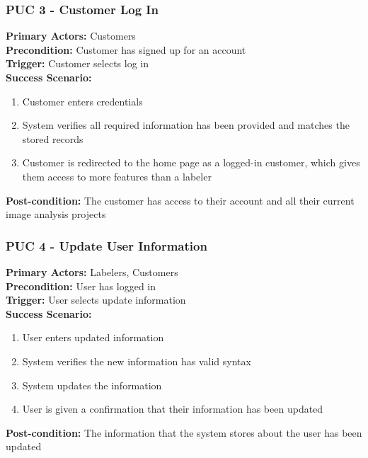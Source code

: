 \documentclass[12pt]{article}
\begin{document}
\subsubsection{PUC 3 - Customer Log In}
\textbf{Primary Actors:} Customers\\ 
\textbf{Precondition:} Customer has signed up for an account\\
\textbf{Trigger:} Customer selects log in\\
\textbf{Success Scenario:}
\begin{enumerate}
    \item Customer enters credentials
    \item System verifies all required information has been provided and matches the stored records
    \item Customer is redirected to the home page as a logged-in customer, which gives them access to more features than a labeler
\end{enumerate}
\textbf{Post-condition:} The customer has access to their account and all their current image analysis projects

\subsubsection{PUC 4 - Update User Information}
\textbf{Primary Actors:} Labelers, Customers\\ 
\textbf{Precondition:} User has logged in\\
\textbf{Trigger:} User selects update information\\
\textbf{Success Scenario:}
\begin{enumerate}
    \item User enters updated information
    \item System verifies the new information has valid syntax
    \item System updates the information
    \item User is given a confirmation that their information has been updated
\end{enumerate}
\textbf{Post-condition:} The information that the system stores about the user has been updated
\end{document}
